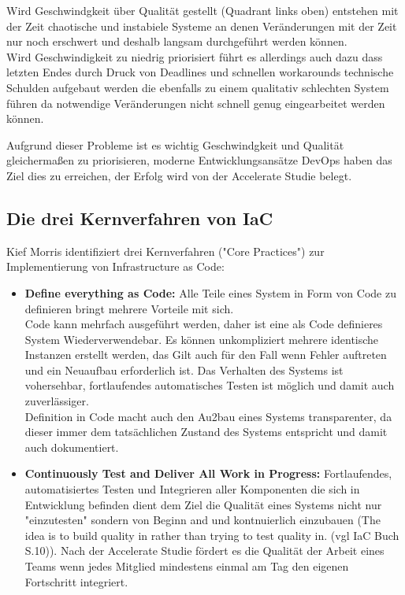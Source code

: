 \begin{spacing}{1.2}
Wird Geschwindgkeit über Qualität gestellt (Quadrant links oben) entstehen
mit der Zeit chaotische und instabiele Systeme an denen Veränderungen mit
der Zeit nur noch erschwert und deshalb langsam durchgeführt werden können.\\
Wird Geschwindigkeit zu niedrig priorisiert führt es allerdings auch dazu
dass letzten Endes durch Druck von Deadlines und schnellen workarounds
technische Schulden aufgebaut werden die ebenfalls zu einem qualitativ
schlechten System führen da notwendige Veränderungen nicht schnell genug
eingearbeitet werden können.

Aufgrund dieser Probleme ist es wichtig Geschwindgkeit und Qualität
gleichermaßen zu priorisieren, moderne Entwicklungsansätze DevOps
haben das Ziel dies zu erreichen, der Erfolg wird von der
Accelerate Studie belegt.

\subsection{Die drei Kernverfahren von IaC}

Kief Morris identifiziert drei Kernverfahren ("Core Practices")
zur Implementierung von Infrastructure as Code:

\begin{itemize} 
  \item \textbf{Define everything as Code:} Alle Teile eines System
  in Form von Code zu definieren bringt mehrere Vorteile mit sich.\\
  Code kann mehrfach ausgeführt werden, daher ist eine als Code
  definieres System Wiederverwendebar. Es können unkompliziert mehrere
  identische Instanzen erstellt werden, das Gilt auch für den Fall
  wenn Fehler auftreten und ein Neuaufbau erforderlich ist.
  Das Verhalten des Systems ist vohersehbar, fortlaufendes automatisches
  Testen ist möglich und damit auch zuverlässiger.\\
  Definition in Code macht auch den Au2bau eines Systems transparenter,
  da dieser immer dem tatsächlichen Zustand des Systems entspricht und
  damit auch dokumentiert.
  
  \item \textbf{Continuously Test and Deliver All Work in Progress:} 
  Fortlaufendes, automatisiertes Testen und Integrieren aller Komponenten
  die sich in Entwicklung befinden dient dem Ziel die Qualität eines
  Systems nicht nur "einzutesten" sondern von Beginn and und kontnuierlich
  einzubauen
  (The idea is to build quality in rather than trying to test quality in.
  (vgl IaC Buch S.10)). Nach der Accelerate Studie fördert es die Qualität
  der Arbeit eines Teams wenn jedes Mitglied mindestens einmal am Tag den
  eigenen Fortschritt integriert.


\end{itemize}
\end{spacing}
